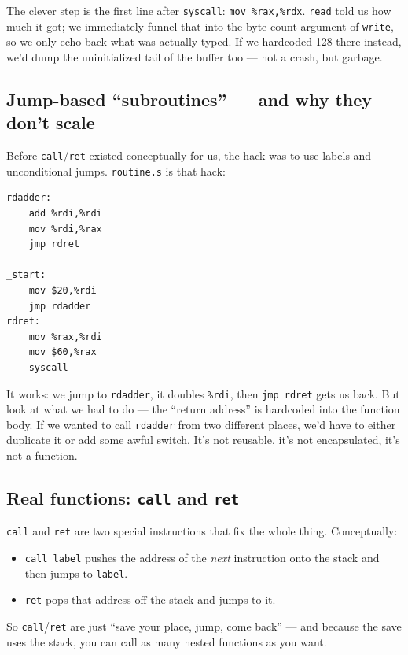 \documentclass[11pt]{article}
\begin{document}
The clever step is the first line after \texttt{syscall}:
\texttt{mov \%rax,\%rdx}. \texttt{read} told us how much it got; we
immediately funnel that into the byte-count argument of \texttt{write},
so we only echo back what was actually typed. If we hardcoded 128
there instead, we'd dump the uninitialized tail of the buffer too ---
not a crash, but garbage.

\subsection*{Jump-based ``subroutines'' --- and why they don't scale}

Before \texttt{call}/\texttt{ret} existed conceptually for us, the
hack was to use labels and unconditional jumps. \texttt{routine.s} is
that hack:

\begin{lstlisting}
rdadder:
    add %rdi,%rdi
    mov %rdi,%rax
    jmp rdret

_start:
    mov $20,%rdi
    jmp rdadder
rdret:
    mov %rax,%rdi
    mov $60,%rax
    syscall
\end{lstlisting}

It works: we jump to \texttt{rdadder}, it doubles \texttt{\%rdi},
then \texttt{jmp rdret} gets us back. But look at what we had to do
--- the ``return address'' is hardcoded into the function body. If we
wanted to call \texttt{rdadder} from two different places, we'd have
to either duplicate it or add some awful switch. It's not reusable,
it's not encapsulated, it's not a function.

\subsection*{Real functions: \texttt{call} and \texttt{ret}}

\texttt{call} and \texttt{ret} are two special instructions that fix
the whole thing. Conceptually:

\begin{itemize}
  \item \texttt{call label} pushes the address of the \emph{next}
    instruction onto the stack and then jumps to \texttt{label}.
  \item \texttt{ret} pops that address off the stack and jumps to it.
\end{itemize}

So \texttt{call}/\texttt{ret} are just ``save your place, jump, come
back'' --- and because the save uses the stack, you can call as many
nested functions as you want.
\end{document}
